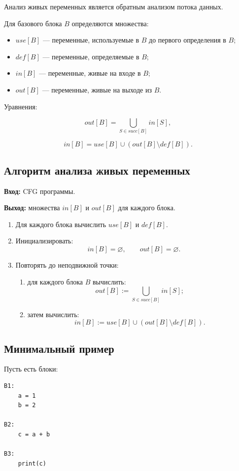 \documentclass[12pt,a4paper]{article}
\begin{document}
Анализ живых переменных является обратным анализом потока данных.

Для базового блока $B$ определяются множества:
\begin{itemize}
    \item $use[B]$ --- переменные, используемые в $B$ до первого определения в $B$;
    \item $def[B]$ --- переменные, определяемые в $B$;
    \item $in[B]$ --- переменные, живые на входе в $B$;
    \item $out[B]$ --- переменные, живые на выходе из $B$.
\end{itemize}

Уравнения:

\[
out[B] = \bigcup_{S \in succ[B]} in[S],
\]

\[
in[B] = use[B] \cup (out[B] \setminus def[B]).
\]

\subsection{Алгоритм анализа живых переменных}

\textbf{Вход:} CFG программы.

\textbf{Выход:} множества $in[B]$ и $out[B]$ для каждого блока.

\begin{enumerate}
    \item Для каждого блока вычислить $use[B]$ и $def[B]$.
    \item Инициализировать:
    \[
    in[B] = \varnothing,\qquad out[B] = \varnothing.
    \]
    \item Повторять до неподвижной точки:
    \begin{enumerate}
        \item для каждого блока $B$ вычислить:
        \[
        out[B] := \bigcup_{S \in succ[B]} in[S];
        \]
        \item затем вычислить:
        \[
        in[B] := use[B] \cup (out[B] \setminus def[B]).
        \]
    \end{enumerate}
\end{enumerate}

\subsection{Минимальный пример}

Пусть есть блоки:

\begin{lstlisting}
B1:
    a = 1
    b = 2

B2:
    c = a + b

B3:
    print(c)
\end{lstlisting}
\end{document}
